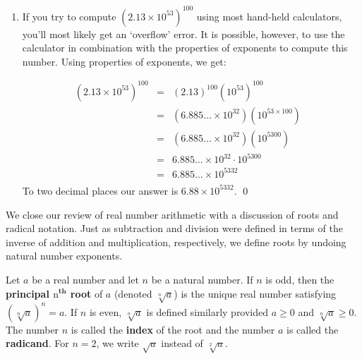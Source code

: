 \documentclass{ximera}
\begin{document}
\begin{example}
\begin{enumerate}
\smallskip

We could have done that whole computation on a calculator so why did we bother doing any of this by hand in the first place?  The answer lies in the next example.

\item If you try to compute  $\left(2.13 \times 10^{53}\right)^{100}$ using most hand-held calculators, you'll most likely get an `overflow' error.  It is possible, however, to use the calculator in combination with the properties of exponents to compute this number.  Using properties of exponents, we get:

\[ \begin{array}{rclr}

\left(2.13 \times 10^{53}\right)^{100} & = & (2.13)^{100} \left(10^{53}\right)^{100} & \\
																			 & = & \left(6.885 \ldots \times 10^{32}\right) \left(10^{53 \times 100}\right) & \\
																			 & = & \left(6.885 \ldots \times 10^{32}\right) \left(10^{5300}\right) & \\
																			 & = & 6.885 \ldots \times 10^{32} \cdot 10^{5300} & \\
																			 & = & 6.885 \ldots \times 10^{5332} & \\ \end{array} \]
To two decimal places our answer is $6.88 \times 10^{5332}$. \qed


\end{enumerate}

\end{example}

We close our review of real number arithmetic with a discussion of roots and radical notation.  Just as subtraction and division were defined in terms of the inverse of addition and multiplication, respectively, we define roots by undoing natural number exponents.

\medskip


\begin{definition} \label{principalnthrootdefn} Let $a$ be a real number and let $n$ be a natural number.  If $n$ is odd, then the \textbf{principal \boldmath $\text{n}^{\textbf{th}}$ root} of $a$ (denoted $\sqrt[n]{a}$) is the unique real number satisfying $\left(\sqrt[n]{a}\right)^n = a$.  If $n$ is even, $\sqrt[n]{a}$ is defined similarly provided  $a \geq 0$ and $\sqrt[n]{a} \geq 0$.  The number $n$ is called the \textbf{index} of the root and the number $a$ is called the \textbf{radicand}.  For $n=2$, we write $\sqrt{a}$ instead of $\sqrt[2]{a}$.

\end{definition}
\end{document}
